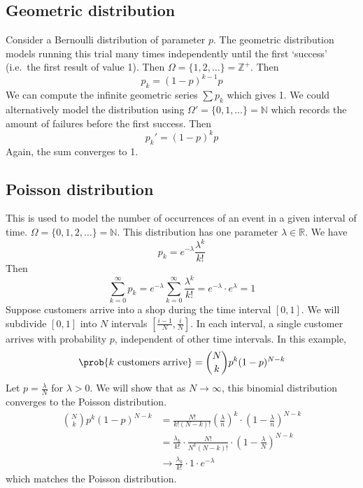 \subsection{Geometric distribution}
Consider a Bernoulli distribution of parameter \(p\).
The geometric distribution models running this trial many times independently until the first `success' (i.e.\ the first result of value 1).
Then \(\Omega = \{ 1, 2, \dots \} = \mathbb Z^+\).
Then
\[
	p_k = (1-p)^{k-1}p
\]
We can compute the infinite geometric series \(\sum p_k\) which gives 1.
We could alternatively model the distribution using \(\Omega' = \{ 0, 1, \dots \} = \mathbb N\) which records the amount of failures before the first success.
Then
\[
	p_k' = (1-p)^k p
\]
Again, the sum converges to 1.

\subsection{Poisson distribution}
This is used to model the number of occurrences of an event in a given interval of time.
\(\Omega = \{ 0, 1, 2, \dots \} = \mathbb N\).
This distribution has one parameter \(\lambda \in \mathbb R\).
We have
\[
	p_k = e^{-\lambda} \frac{\lambda^k}{k!}
\]
Then
\[
	\sum_{k=0}^\infty p_k = e^{-\lambda}  \sum_{k=0}^\infty \frac{\lambda^k}{k!} = e^{-\lambda} \cdot e^{\lambda} = 1
\]
Suppose customers arrive into a shop during the time interval \([0, 1]\).
We will subdivide \([0, 1]\) into \(N\) intervals \(\left[ \frac{i-1}{N}, \frac{i}{N} \right]\).
In each interval, a single customer arrives with probability \(p\), independent of other time intervals.
In this example,
\[
	\prob{k \text{ customers arrive}} = \binom{N}{k} p^k (1-p)^{N-k}
\]
Let \(p = \frac{\lambda}{N}\) for \(\lambda > 0\).
We will show that as \(N \to \infty\), this binomial distribution converges to the Poisson distribution.
\begin{align*}
	\binom{N}{k} p^k (1-p)^{N-k} & = \frac{N!}{k!(N-k)!} \left( \frac{\lambda}{n} \right)^k \cdot \left( 1 - \frac{\lambda}{n} \right)^{N-k} \\
	                             & = \frac{\lambda_k}{k!} \cdot \frac{N!}{N^k(N-k)!} \cdot \left( 1 - \frac{\lambda}{N} \right)^{N-k}        \\
	                             & \to \frac{\lambda_k}{k!} \cdot 1 \cdot e^{-\lambda}
\end{align*}
which matches the Poisson distribution.
